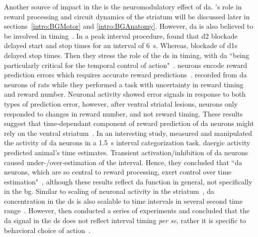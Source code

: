 \par
Another source of impact in the  is the neuromodulatory effect of \gls{da}.
's role in reward processing and circuit dynamics of the striatum will be discussed later in sections~\ref{intro:BGMotor} and \ref{intro:BGAnatomy}.
However, \gls{da} is also believed to be involved in timing~\cite{Paton2018NeuronRev}.
In a peak interval procedure\footnotemark,  found that \gls{d2} blockade delayed start and stop times for an interval of 6~s.
Whereas, blockade of \glspl{d1} delayed stop times.
Then they stress the role of the \gls{ds} in timing, with \gls{da} ``being particularly critical for the temporal control of action"~\cite{DeCorte2019}.
 neurons encode reward prediction errors which requires accurate reward predictions~\cite[see][]{Berke2018NN}.
 recorded from \gls{da} neurons of rats while they performed a task with uncertainty in reward timing and reward number.
Neuronal activity showed error signals in response to both types of prediction error, however, after ventral striatal lesions, neurons only responded to changes in reward number, and not reward timing.
These results suggest that time-dependant component of reward prediction of \gls{da} neurons might rely on the ventral striatum~\cite{Takahashi2016}.
In an interesting study,  measured and manipulated the activity of \gls{da} neurons in a 1.5~s interval categorization task.
\Gls{da}ergic activity predicted animal's time estimates.
Transient activation/inhibition of \gls{da} neurons caused under-/over-estimation of the interval.
Hence, they concluded that ``\gls{da} neurons, which are so central to reward processing, exert control over time estimation"~\cite{Paton2016Sci}, although these results reflect \gls{da} function in general, not specifically in the \gls{bg}.
Similar to scaling of neuronal activity in the striatum~\cite{Mello2015}, \gls{da} concentration in the \gls{ds} is also scalable to time intervals in several second time range~\cite{Howard2017}.
However, \citeauthor{Howard2017} then conducted a series of experiments and concluded that the \gls{da} signal in the \gls{ds} does not reflect interval timing \textit{per se}, rather it is specific to behavioral choice of action~\cite{Howard2017}.